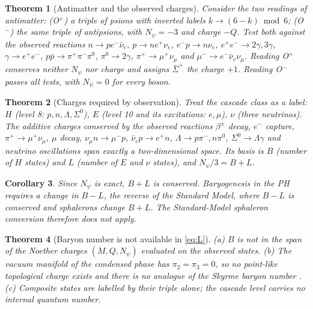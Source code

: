 \documentclass[11pt]{article}
\newtheorem{theorem}{Theorem}
\newtheorem{corollary}[theorem]{Corollary}
\newcommand{\Np}{N_\psi}
\begin{document}
\begin{theorem}[Antimatter and the observed charges]\label{th:ont}
Consider the two readings of antimatter: (O$^+$) a triple of psions with inverted labels $k\to(6-k)\bmod6$; (O$^-$) the same triple of antipsions, with $\Np=-3$ and charge $-Q$. Test both against the observed reactions $n\to pe^-\bar\nu_e$, $p\to ne^+\nu_e$, $e^-p\to n\nu_e$, $e^+e^-\to2\gamma,3\gamma$, $\gamma\to e^+e^-$, $p\bar p\to\pi^+\pi^-\pi^0$, $\pi^0\to2\gamma$, $\pi^+\to\mu^+\nu_\mu$ and $\mu^-\to e^-\bar\nu_e\nu_\mu$. Reading O$^+$ conserves neither $\Np$ nor charge and assigns $\bar\Sigma^+$ the charge $+1$. Reading O$^-$ passes all tests, with $\Np=0$ for every boson.
\end{theorem}

\begin{theorem}[Charges required by observation]\label{th:BL}
Treat the cascade class as a label: $H$ (level 8: $p,n,\Lambda,\Sigma^0$), $E$ (level 10 and its excitations: $e,\mu$), $\nu$ (three neutrinos). The additive charges conserved by the observed reactions $\beta^\pm$ decay, $e^-$ capture, $\pi^+\to\mu^+\nu_\mu$, $\mu$ decay, $\nu_\mu n\to\mu^-p$, $\bar\nu_ep\to e^+n$, $\Lambda\to p\pi^-,n\pi^0$, $\Sigma^0\to\Lambda\gamma$ and neutrino oscillations span exactly a two-dimensional space. Its basis is $B$ (number of $H$ states) and $L$ (number of $E$ and $\nu$ states), and $\Np/3=B+L$.
\end{theorem}

\begin{corollary}
Since $\Np$ is exact, $B+L$ is conserved. Baryogenesis in the PH requires a change in $B-L$, the reverse of the Standard Model, where $B-L$ is conserved and sphalerons change $B+L$. The Standard-Model sphaleron conversion therefore does not apply.
\end{corollary}

\begin{theorem}[Baryon number is not available in \eqref{eq:L}]\label{th:noB}
(a) $B$ is not in the span of the Noether charges $(M,Q,\Np)$ evaluated on the observed states. (b) The vacuum manifold of the condensed phase has $\pi_2=\pi_3=0$, so no point-like topological charge exists and there is no analogue of the Skyrme baryon number \cite{witten}. (c) Composite states are labelled by their triple alone; the cascade level carries no internal quantum number.
\end{theorem}
\end{document}
